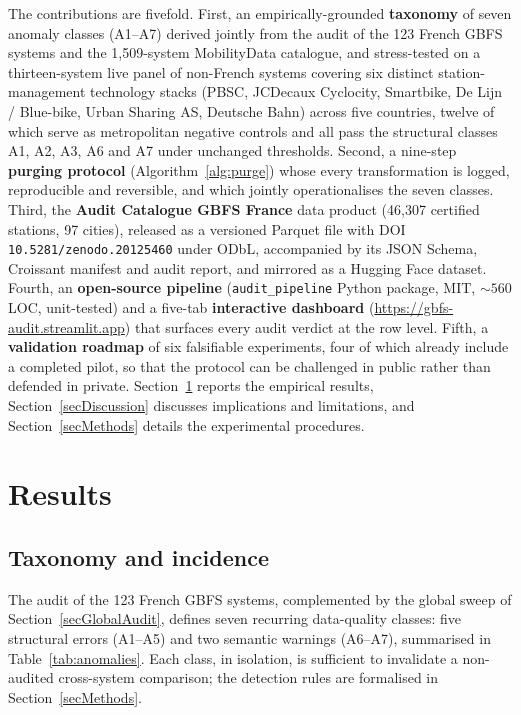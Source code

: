 \documentclass[11pt,a4paper]{article}
\begin{document}
The contributions are fivefold. First, an empirically-grounded
\textbf{taxonomy} of seven anomaly classes (A1--A7) derived
jointly from the audit of the 123 French GBFS systems and the
1{,}509-system MobilityData catalogue, and stress-tested on a
thirteen-system live panel of non-French systems covering six
distinct station-management technology stacks (PBSC, JCDecaux
Cyclocity, Smartbike, De Lijn / Blue-bike, Urban Sharing AS,
Deutsche Bahn) across five countries, twelve of which serve as
metropolitan negative controls and all pass the structural
classes A1, A2, A3, A6 and A7 under unchanged thresholds. Second, a
nine-step \textbf{purging protocol} (Algorithm~\ref{alg:purge})
whose every transformation is logged, reproducible and reversible,
and which jointly operationalises the seven classes.
Third, the \textbf{Audit Catalogue GBFS France} data product
(46{,}307 certified stations, 97 cities), released as a versioned
Parquet file with DOI \texttt{10.5281/zenodo.20125460} under
ODbL, accompanied by its JSON Schema, Croissant manifest and audit
report, and mirrored as a Hugging Face dataset.
Fourth, an \textbf{open-source pipeline} (\texttt{audit\_pipeline}
Python package, MIT, $\sim 560$ LOC, unit-tested) and a
five-tab \textbf{interactive dashboard}
(\url{https://gbfs-audit.streamlit.app}) that surfaces every
audit verdict at the row level.
Fifth, a \textbf{validation roadmap} of six falsifiable experiments,
four of which already include a completed pilot, so that the
protocol can be challenged in public rather than defended in
private. Section~\ref{secResults} reports the empirical results,
Section~\ref{secDiscussion} discusses implications and limitations, and
Section~\ref{secMethods} details the experimental procedures.

\section{Results}\label{secResults}

\subsection{Taxonomy and incidence}
\label{secTaxonomy}
The audit of the 123 French GBFS systems, complemented by the
global sweep of Section~\ref{secGlobalAudit}, defines seven
recurring data-quality classes: five structural errors
(A1--A5) and two semantic warnings (A6--A7), summarised in
Table~\ref{tab:anomalies}. Each class, in isolation, is sufficient
to invalidate a non-audited cross-system comparison; the
detection rules are formalised in Section~\ref{secMethods}.
\end{document}
